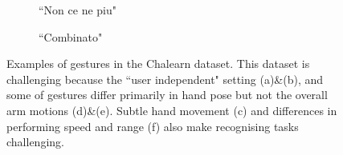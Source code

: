 \begin{figure}[t]
        \begin{subfigure}[c]{0.15\textwidth}
        \centering
                \caption{``Non ce ne piu"}
        \end{subfigure}
       \begin{subfigure}[c]{0.15\textwidth}
        \centering
                \caption{``Combinato"}
        \end{subfigure}
  \caption{
Examples of gestures in the Chalearn dataset.
This dataset is challenging because the ``user independent" setting (a)\&(b), and some of gestures differ primarily in hand pose but not the overall arm motions (d)\&(e).
Subtle hand movement (c) and differences in performing speed and range (f) also make recognising tasks challenging.
  }
\label{fig:chalearnclasses}
\end{figure}




